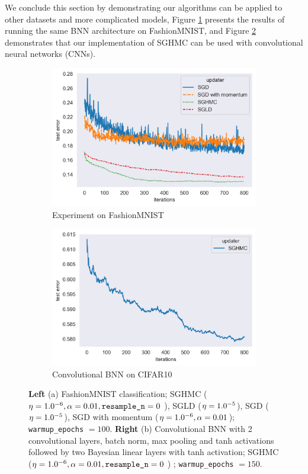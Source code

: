 We conclude this section by demonstrating our algorithms can be applied to other datasets and more complicated models, Figure \ref{fig:fashionMNIST} presents the results of running the same BNN architecture on FashionMNIST, and Figure \ref{fig:CIFAR10} demonstrates that our implementation of SGHMC can be used with convolutional neural networks (CNNs).
\begin{figure}[h!]
\centering
\begin{subfigure}{.5\textwidth}
  \centering
  \includegraphics[width=.95\linewidth]{parts/Images/fashion-mnist.png}
  \caption{Experiment on FashionMNIST}
  \label{fig:fashionMNIST}
\end{subfigure}%
\begin{subfigure}{.5\textwidth}
  \centering
  \includegraphics[width=.95\linewidth]{parts/Images/CIFAR10.png}
  \caption{Convolutional BNN on CIFAR10}
  \label{fig:CIFAR10}
\end{subfigure}
\caption{{\bf Left} (a) FashionMNIST classification; SGHMC ($\eta = 1.0\time10^{-6}, \alpha=0.01, \texttt{resample\_n} =0$ ), SGLD ($\eta = 1.0\time10^{-5}$), SGD ($\eta = 1.0\time10^{-5}$), SGD with momentum ($\eta = 1.0\time10^{-6}, \alpha=0.01$); \texttt{warmup\_epochs} $= 100$. {\bf Right} (b) Convolutional BNN with 2 convolutional layers, batch norm, max pooling and tanh activations followed by two Bayesian linear layers with tanh activation;  SGHMC ($\eta = 1.0\time10^{-6}, \alpha=0.01, \texttt{resample\_n} =0$ ) ; \texttt{warmup\_epochs} $= 150$.}
\label{fig:other-datasets}
\end{figure}